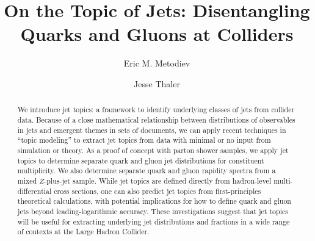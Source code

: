 \documentclass[aps,prl,floatfix,preprintnumbers,twocolumn,groupedaddress,nofootinbib,longbibliography]{revtex4-1}
\begin{document}
\title{On the Topic of Jets: Disentangling Quarks and Gluons at Colliders}

\author{Eric M. Metodiev}

\author{Jesse Thaler}


\begin{abstract}
We introduce jet topics: a framework to identify underlying classes of jets from collider data.
%
Because of a close mathematical relationship between distributions of observables in jets and emergent themes in sets of documents, we can apply recent techniques in ``topic modeling'' to extract jet topics from data with minimal or no input from simulation or theory. 
%
As a proof of concept with parton shower samples, we apply jet topics to determine separate quark and gluon jet distributions for constituent multiplicity.
%
We also determine separate quark and gluon rapidity spectra from a mixed $Z$-plus-jet sample.
%
While jet topics are defined directly from hadron-level multi-differential cross sections, one can also predict jet topics from first-principles theoretical calculations, with potential implications for how to define quark and gluon jets beyond leading-logarithmic accuracy.
%
These investigations suggest that jet topics will be useful for extracting underlying jet distributions and fractions in a wide range of contexts at the Large Hadron Collider.
\end{abstract}

\maketitle
\end{document}

